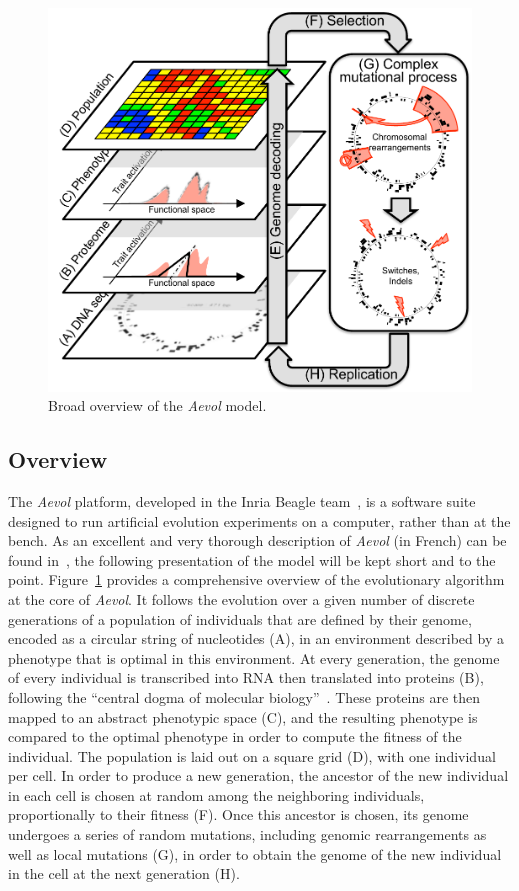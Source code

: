 \begin{figure}[H]
\includegraphics[width=\textwidth]{aevol/images/aevol.pdf}
\caption[Overview of the \emph{Aevol} model]{Broad overview of the \emph{Aevol} model.}
\label{fig:aevol:model}
\end{figure}

\subsection{Overview}

The \emph{Aevol} platform, developed in the Inria Beagle team~\citep{rutten2019}, is a software suite designed to run artificial evolution experiments on a computer, rather than at the bench.
As an excellent and very thorough description of \emph{Aevol} (in French) can be found in~\cite{liard2020b}, the following presentation of the model will be kept short and to the point.
Figure~\ref{fig:aevol:model} provides a comprehensive overview of the evolutionary algorithm at the core of \emph{Aevol}.
It follows the evolution over a given number of discrete generations of a population of individuals that are defined by their genome, encoded as a circular string of nucleotides (A), in an environment described by a phenotype that is optimal in this environment.
At every generation, the genome of every individual is transcribed into RNA then translated into proteins (B), following the ``central dogma of molecular biology''~\citep{crick1958}.
These proteins are then mapped to an abstract phenotypic space (C), and the resulting phenotype is compared to the optimal phenotype in order to compute the fitness of the individual.
The population is laid out on a square grid (D), with one individual per cell.
In order to produce a new generation, the ancestor of the new individual in each cell is chosen at random among the neighboring individuals, proportionally to their fitness (F).
Once this ancestor is chosen, its genome undergoes a series of random mutations, including genomic rearrangements as well as local mutations (G), in order to obtain the genome of the new individual in the cell at the next generation (H).

